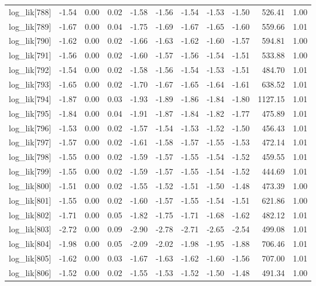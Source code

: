 \begin{table}[ht]
\begin{tabular}{rrrrrrrrrrr}
  log\_lik[788] & -1.54 & 0.00 & 0.02 & -1.58 & -1.56 & -1.54 & -1.53 & -1.50 & 526.41 & 1.00 \\ 
  log\_lik[789] & -1.67 & 0.00 & 0.04 & -1.75 & -1.69 & -1.67 & -1.65 & -1.60 & 559.66 & 1.01 \\ 
  log\_lik[790] & -1.62 & 0.00 & 0.02 & -1.66 & -1.63 & -1.62 & -1.60 & -1.57 & 594.81 & 1.00 \\ 
  log\_lik[791] & -1.56 & 0.00 & 0.02 & -1.60 & -1.57 & -1.56 & -1.54 & -1.51 & 533.88 & 1.00 \\ 
  log\_lik[792] & -1.54 & 0.00 & 0.02 & -1.58 & -1.56 & -1.54 & -1.53 & -1.51 & 484.70 & 1.01 \\ 
  log\_lik[793] & -1.65 & 0.00 & 0.02 & -1.70 & -1.67 & -1.65 & -1.64 & -1.61 & 638.52 & 1.01 \\ 
  log\_lik[794] & -1.87 & 0.00 & 0.03 & -1.93 & -1.89 & -1.86 & -1.84 & -1.80 & 1127.15 & 1.01 \\ 
  log\_lik[795] & -1.84 & 0.00 & 0.04 & -1.91 & -1.87 & -1.84 & -1.82 & -1.77 & 475.89 & 1.01 \\ 
  log\_lik[796] & -1.53 & 0.00 & 0.02 & -1.57 & -1.54 & -1.53 & -1.52 & -1.50 & 456.43 & 1.01 \\ 
  log\_lik[797] & -1.57 & 0.00 & 0.02 & -1.61 & -1.58 & -1.57 & -1.55 & -1.53 & 472.14 & 1.01 \\ 
  log\_lik[798] & -1.55 & 0.00 & 0.02 & -1.59 & -1.57 & -1.55 & -1.54 & -1.52 & 459.55 & 1.01 \\ 
  log\_lik[799] & -1.55 & 0.00 & 0.02 & -1.59 & -1.57 & -1.55 & -1.54 & -1.52 & 444.69 & 1.01 \\ 
  log\_lik[800] & -1.51 & 0.00 & 0.02 & -1.55 & -1.52 & -1.51 & -1.50 & -1.48 & 473.39 & 1.00 \\ 
  log\_lik[801] & -1.55 & 0.00 & 0.02 & -1.60 & -1.57 & -1.55 & -1.54 & -1.51 & 621.86 & 1.00 \\ 
  log\_lik[802] & -1.71 & 0.00 & 0.05 & -1.82 & -1.75 & -1.71 & -1.68 & -1.62 & 482.12 & 1.01 \\ 
  log\_lik[803] & -2.72 & 0.00 & 0.09 & -2.90 & -2.78 & -2.71 & -2.65 & -2.54 & 499.08 & 1.01 \\ 
  log\_lik[804] & -1.98 & 0.00 & 0.05 & -2.09 & -2.02 & -1.98 & -1.95 & -1.88 & 706.46 & 1.01 \\ 
  log\_lik[805] & -1.62 & 0.00 & 0.03 & -1.67 & -1.63 & -1.62 & -1.60 & -1.56 & 707.00 & 1.01 \\ 
  log\_lik[806] & -1.52 & 0.00 & 0.02 & -1.55 & -1.53 & -1.52 & -1.50 & -1.48 & 491.34 & 1.00 \\ 

\end{tabular}
\end{table}
